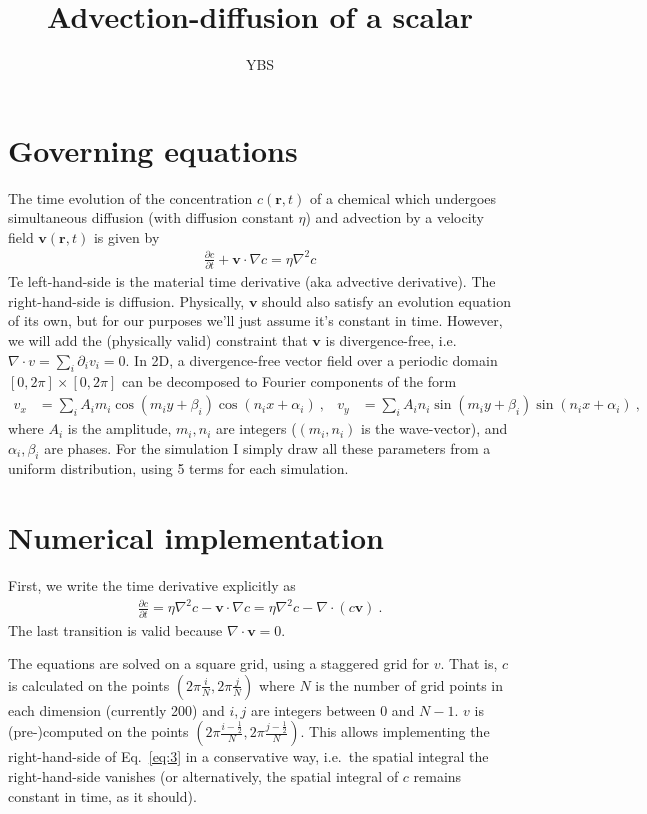 \documentclass{article}
\newcommand{\pa}{\partial}
\newcommand{\pd}[2]{\frac{\partial #1}{\partial #2}}
\newcommand{\0}{^{(0)}}
\begin{document}
\title{Advection-diffusion of a scalar}
\author{YBS}
\maketitle

\section{Governing equations}
The time evolution of the concentration $c(\bm r, t)$ of a chemical which undergoes simultaneous diffusion (with diffusion constant $\eta$) and advection by a velocity field $\bm v(\bm r , t)$ is given by 
\begin{align}
\pd{c}{t}+\bm v \cdot \nabla c=\eta \nabla^2 c
\label{eq:eom}
\end{align}
Te left-hand-side is the material time derivative (aka advective derivative).  The right-hand-side is diffusion. Physically, $\bm v$ should also satisfy an evolution equation of its own, but for our purposes we'll just assume it's constant in time. However, we will add the (physically valid) constraint that $\bm v$ is divergence-free, i.e.~$\nabla\cdot v=\sum_i \pa_i v_i=0$. In 2D, a divergence-free vector field over a periodic domain $[0,2\pi]\times[0,2\pi]$ can be decomposed to Fourier components of the form
\begin{align}
v_x&= \sum_i A_i m_i \cos (m_i y+\beta_i ) \cos (n_i x+\alpha_i )\ , &
v_y&=\sum_i A_i  n_i \sin (m_i y+\beta_i ) \sin (n_i x+\alpha_i )\ ,
\end{align}
where $A_i$ is the amplitude, $m_i, n_i$ are integers ($(m_i, n_i)$  is the wave-vector), and $\alpha_i, \beta_i$ are phases. For the simulation I simply draw all these parameters from a uniform distribution, using 5 terms for each simulation. 

\section{Numerical implementation}
First, we write the time derivative explicitly as
\begin{align}
\pd{c}{t}=\eta \nabla^2 c - \bm v\cdot\nabla c=\eta \nabla^2 c - \nabla \cdot (c \bm v)\ .
\label{eq:3}
\end{align}
The last transition is valid because $\nabla\cdot \bm v=0$.

The equations are solved on a square grid, using a staggered grid for $v$. That is, $c$ is calculated on the points $ \left(2\pi \frac{i}{N},2\pi \frac{j}{N}\right)$ where $N$ is the number of grid points in each dimension (currently 200) and $i,j$ are integers between 0 and $N-1$. $v$ is (pre-)computed on the points $ \left(2\pi \frac{i-\frac{1}{2}}{N},2\pi \frac{j-\frac{1}{2}}{N}\right)$. This allows implementing the right-hand-side of Eq.~\eqref{eq:3} in a conservative way, i.e.~the spatial integral the right-hand-side vanishes (or alternatively, the spatial integral of $c$ remains constant in time, as it should).
 
\end{document}
